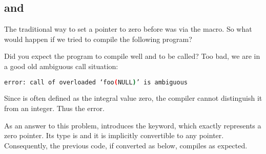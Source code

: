\subsection{ and }

The traditional way to set a pointer to zero before  was via the
 macro. So what would happen if we tried to compile the
following program?



Did you expect the program to compile well and  to be
called? Too bad, we are in a good old ambiguous call situation:

\begin{lstlisting}[language=bash]
error: call of overloaded ‘foo(NULL)’ is ambiguous
\end{lstlisting}

Since  is often defined as the integral value zero, the
compiler cannot distinguish it from an integer. Thus the error.

\bigskip

%
%
As an answer to this problem,  introduces the 
keyword, which exactly represents a zero pointer. Its type is
 and it is implicitly convertible to any
pointer. Consequently, the previous code, if converted as below,
compiles as expected.


